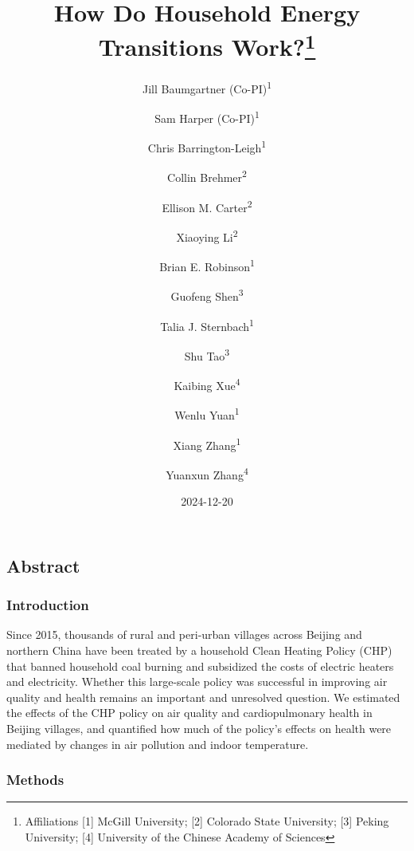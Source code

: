 \documentclass[
  letterpaper,
  DIV=11,
  numbers=noendperiod]{scrartcl}
\title{How Do Household Energy Transitions Work?\thanks{Affiliations
{[}1{]} McGill University; {[}2{]} Colorado State University; {[}3{]}
Peking University; {[}4{]} University of the Chinese Academy of
Sciences}}
\author{Jill Baumgartner (Co-PI)\textsuperscript{1} \and Sam Harper
(Co-PI)\textsuperscript{1} \and Chris
Barrington-Leigh\textsuperscript{1} \and Collin
Brehmer\textsuperscript{2} \and Ellison M.
Carter\textsuperscript{2} \and Xiaoying Li\textsuperscript{2} \and Brian
E. Robinson\textsuperscript{1} \and Guofeng
Shen\textsuperscript{3} \and Talia J.
Sternbach\textsuperscript{1} \and Shu
Tao\textsuperscript{3} \and Kaibing Xue\textsuperscript{4} \and Wenlu
Yuan\textsuperscript{1} \and Xiang Zhang\textsuperscript{1} \and Yuanxun
Zhang\textsuperscript{4}}
\date{2024-12-20}
\renewcommand*\contentsname{Table of contents}
\newcommand\contentsname{Table of contents}
\begin{document}
\maketitle

\renewcommand*\contentsname{Table of contents}
{
\hypersetup{linkcolor=}
\setcounter{tocdepth}{3}
\tableofcontents
}

\subsection*{Abstract}\label{abstract}

\subsubsection*{Introduction}\label{introduction}

Since 2015, thousands of rural and peri-urban villages across Beijing
and northern China have been treated by a household Clean Heating Policy
(CHP) that banned household coal burning and subsidized the costs of
electric heaters and electricity. Whether this large-scale policy was
successful in improving air quality and health remains an important and
unresolved question. We estimated the effects of the CHP policy on air
quality and cardiopulmonary health in Beijing villages, and quantified
how much of the policy's effects on health were mediated by changes in
air pollution and indoor temperature.

\subsubsection*{Methods}\label{methods}
\end{document}
